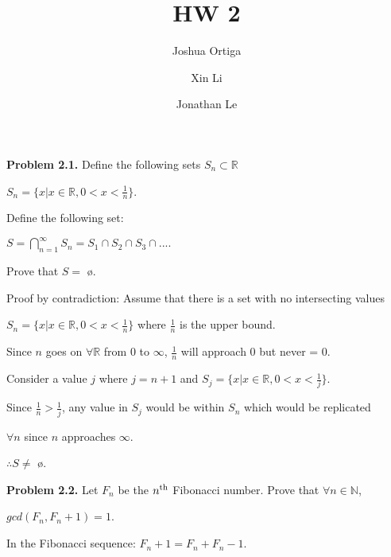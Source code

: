 \documentclass{article}
\title{HW 2}
\author{Joshua Ortiga \\
		\and
		Xin Li \\
		\and
		Jonathan Le}
\begin{document}
\maketitle
\textbf{Problem 2.1.} Define the following sets $S_n \subset \mathbb{R}$

\begin{center}
	$S_n = \{x|x \in \mathbb{R}, 0 < x < \frac{1}{n}\}$.
\end{center}

\hspace{1cm} Define the following set:

\begin{center}
	$S = \displaystyle\bigcap_{n=1}^{\infty} S_n = S_1 \cap S_2 \cap S_3 \cap ....$
\end{center}

\hspace{1cm} Prove that $S = $ \o.

\vspace{0.5cm}

Proof by contradiction: Assume that there is a set with no intersecting values 

\vspace{0.2cm}

$S_n = \{ x | x \in \mathbb{R}, 0 < x < \frac{1}{n}\}$ where $\frac{1}{n}$ is the upper bound.

\vspace{0.2cm}

Since $n$ goes on $\forall \mathbb{R}$ from 0 to $\infty$, $\frac{1}{n}$ will approach 0 but never = 0.

\vspace{0.2cm}

Consider a value $j$ where $j=n+1$ and $S_j = \{x|x \in \mathbb{R}, 0 < x < \frac{1}{j} \}$.

Since $\frac{1}{n} > \frac{1}{j}$, any value in $S_j$ would be within $S_n$ which would be replicated

$\forall n$ since $n$ approaches $\infty$.

$\therefore S \not = $ \o.

\vspace{0.5cm}

\textbf{Problem 2.2.} Let $F_n$ be the $n\textsuperscript{th}$ Fibonacci number. Prove that $\forall n \in \mathbb{N}$, 

$gcd(F_n,F_n+1) = 1$.

\vspace{0.3cm}

In the Fibonacci sequence: $F_n+1 = F_n + F_n-1$.
\end{document}
